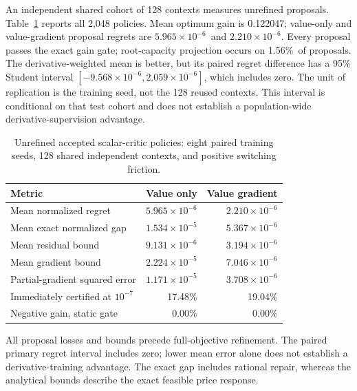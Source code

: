 \documentclass[11pt,letterpaper]{article}
\theoremstyle{definition}
\newcommand{\1}{\mathbf 1}
\newcommand{\RFourteenOptimalGain}{0.122047}
\newcommand{\RFourteenValueRegret}{$5.965\times10^{-6}$}
\newcommand{\RFourteenGradientRegret}{$2.210\times10^{-6}$}
\newcommand{\RFourteenCapRate}{1.56\%}
\newcommand{\RFourteenCILow}{-9.568\times10^{-6}}
\newcommand{\RFourteenCIHigh}{2.059\times10^{-6}}
\begin{document}
An independent shared cohort of 128 contexts measures unrefined proposals. Table~\ref{tab:r14-quality} reports all 2,048 policies. Mean optimum gain is \RFourteenOptimalGain; value-only and value-gradient proposal regrets are \RFourteenValueRegret\ and \RFourteenGradientRegret. Every proposal passes the exact gain gate; root-capacity projection occurs on \RFourteenCapRate\ of proposals. The derivative-weighted mean is better, but its paired regret difference has a 95\% Student interval $[\RFourteenCILow,\RFourteenCIHigh]$, which includes zero. The unit of replication is the training seed, not the 128 reused contexts. This interval is conditional on that test cohort and does not establish a population-wide derivative-supervision advantage.

\begin{table}[t]
\centering
\caption{Unrefined accepted scalar-critic policies: eight paired training seeds, 128 shared independent contexts, and positive switching friction.}
\label{tab:r14-quality}
\begin{tabular}{lrr}
\toprule
Metric & Value only & Value gradient\\
\midrule
Mean normalized regret & $5.965\times10^{-6}$ & $2.210\times10^{-6}$\\
Mean exact normalized gap & $1.534\times10^{-5}$ & $5.367\times10^{-6}$\\
Mean residual bound & $9.131\times10^{-6}$ & $3.194\times10^{-6}$\\
Mean gradient bound & $2.224\times10^{-5}$ & $7.046\times10^{-6}$\\
Partial-gradient squared error & $1.171\times10^{-5}$ & $3.708\times10^{-6}$\\
Immediately certified at $10^{-7}$ & 17.48\% & 19.04\%\\
Negative gain, static gate & 0.00\% & 0.00\%\\
\bottomrule
\end{tabular}
\par\smallskip
\begin{minipage}{0.94\linewidth}
All proposal losses and bounds precede full-objective refinement. The paired primary regret interval includes zero; lower mean error alone does not establish a derivative-training advantage. The exact gap includes rational repair, whereas the analytical bounds describe the exact feasible price response.
\end{minipage}
\end{table}
\end{document}
